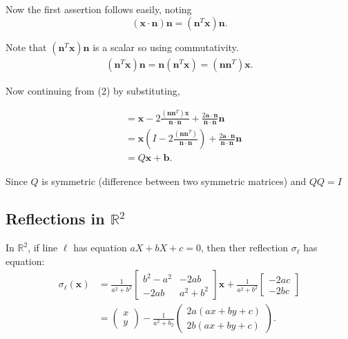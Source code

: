 Now the first assertion follows easily, noting
\[
  (\mathbf{x} \cdot \mathbf{n})\mathbf{n} = \left(\mathbf{n}^{T} \mathbf{x}  \right) \mathbf{n} 
.\] 

Note that \( (\mathbf{n}^{T} \mathbf{x}) \mathbf{n} \) is a scalar so using commutativity.
\begin{align*}
  \left(\mathbf{n}^{T} \mathbf{x}  \right) \mathbf{n} = \mathbf{n} \left(\mathbf{n}^{T} \mathbf{x}  \right) = \left(\mathbf{n} \mathbf{n}^{T}  \right) \mathbf{x}
.\end{align*}

Now continuing from (2) by substituting,

\begin{align*}
  &= \mathbf{x} - 2 \frac{(\mathbf{n} \mathbf{n}^{T})\mathbf{x}}{\mathbf{n} \cdot \mathbf{n}} + \frac{2 \mathbf{a} \cdot \mathbf{n}}{\mathbf{n} \cdot \mathbf{n}} \mathbf{n} \\
  &= \mathbf{x} \left( I - 2 \frac{(\mathbf{n} \mathbf{n}^{T})}{\mathbf{n} \cdot \mathbf{n}}   \right) + \frac{2 \mathbf{a} \cdot \mathbf{n}}{\mathbf{n} \cdot \mathbf{n}} \mathbf{n} \\
  &=  Q \mathbf{x} + \mathbf{b}
.\end{align*}

Since \( Q  \) is symmetric (difference between two symmetric matrices) and \( Q Q = I \) 

\subsection{Reflections in \( \mathbb{R}^{2} \)}

\begin{corollary}
 In \( \mathbb{R}^{2} \), if line \( \ell \) has equation \( aX + bX + c = 0 \), then ther 
 reflection \( \sigma_{\ell} \) has equation:
 \begin{align*}
   \sigma_{\ell}\left(\mathbf{x}  \right) &= \frac{1}{a^2 + b^2} \begin{bmatrix} b^{2} - a^{2} & -2ab \\ -2ab & a^2 + b^2 \end{bmatrix} \mathbf{x} + \frac{1}{a^2 + b^2} \begin{bmatrix} -2ac \\ -2bc \end{bmatrix}  \\
                                          &= \begin{pmatrix} x \\ y \end{pmatrix} - \frac{1}{a^2 + b_{2}} \begin{pmatrix} 2a \left( ax + by + c \right) \\ 2b \left(ax + by + c  \right) \end{pmatrix} 
 .\end{align*}

\end{corollary}

